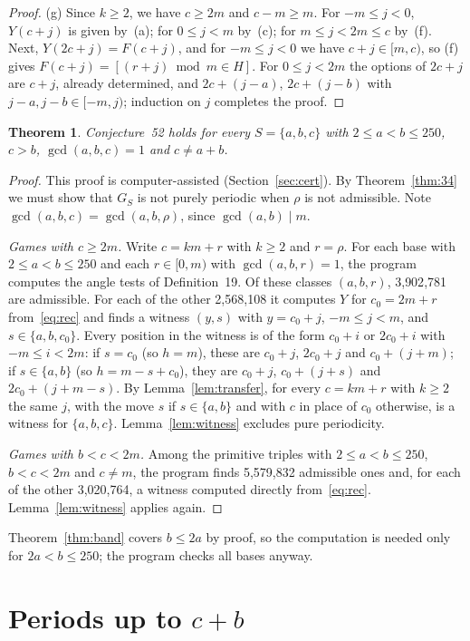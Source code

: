 \documentclass[11pt]{amsart}
\newtheorem{theorem}{Theorem}[section]
\theoremstyle{definition}
\numberwithin{equation}{section}
\begin{document}
\begin{proof}
(g) Since $k\ge2$, we have $c\ge 2m$ and $c-m\ge m$. For $-m\le j<0$, $Y(c+j)$ is given
by~(a); for $0\le j<m$ by~(c); for $m\le j<2m\le c$ by~(f). Next,
$Y(2c+j)=F(c+j)$, and for $-m\le j<0$ we have $c+j\in[m,c)$, so (f) gives
$F(c+j)=[(r+j)\bmod m\in H]$. For $0\le j<2m$ the options of $2c+j$ are $c+j$, already
determined, and $2c+(j-a)$, $2c+(j-b)$ with $j-a,j-b\in[-m,j)$; induction on $j$ completes
the proof.
\end{proof}

\begin{theorem}\label{thm:250}
Conjecture~52 holds for every $S=\{a,b,c\}$ with $2\le a<b\le 250$, $c>b$,
$\gcd(a,b,c)=1$ and $c\ne a+b$.
\end{theorem}

\begin{proof}
This proof is computer-assisted (Section~\ref{sec:cert}). By Theorem~\ref{thm:34} we must
show that $G_S$ is not purely periodic when $\rho$ is not admissible. Note
$\gcd(a,b,c)=\gcd(a,b,\rho)$, since $\gcd(a,b)\mid m$.

\emph{Games with $c\ge 2m$.} Write $c=km+r$ with $k\ge2$ and $r=\rho$. For each base with
$2\le a<b\le250$ and each $r\in[0,m)$ with $\gcd(a,b,r)=1$, the program computes the angle
tests of Definition~19. Of these classes $(a,b,r)$, 3{,}902{,}781 are admissible. For each
of the other 2{,}568{,}108 it computes $Y$ for $c_0=2m+r$ from~\eqref{eq:rec} and finds a
witness $(y,s)$ with $y=c_0+j$, $-m\le j<m$, and $s\in\{a,b,c_0\}$. Every position in the
witness is of the form $c_0+i$ or $2c_0+i$ with $-m\le i<2m$: if $s=c_0$ (so $h=m$), these
are $c_0+j$, $2c_0+j$ and $c_0+(j+m)$; if $s\in\{a,b\}$ (so $h=m-s+c_0$), they are $c_0+j$,
$c_0+(j+s)$ and $2c_0+(j+m-s)$. By Lemma~\ref{lem:transfer}, for every $c=km+r$ with $k\ge2$
the same $j$, with the move $s$ if $s\in\{a,b\}$ and with $c$ in place of $c_0$ otherwise,
is a witness for $\{a,b,c\}$. Lemma~\ref{lem:witness} excludes pure periodicity.

\emph{Games with $b<c<2m$.} Among the primitive triples with $2\le a<b\le250$, $b<c<2m$ and
$c\ne m$, the program finds 5{,}579{,}832 admissible ones and, for each of the other
3{,}020{,}764, a witness computed directly from~\eqref{eq:rec}. Lemma~\ref{lem:witness}
applies again.
\end{proof}

Theorem~\ref{thm:band} covers $b\le 2a$ by proof, so the computation is needed only for
$2a<b\le250$; the program checks all bases anyway.

\section{Periods up to \texorpdfstring{$c+b$}{c+b}}
\end{document}

